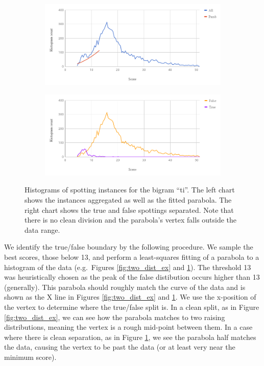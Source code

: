 \documentclass[ms,electronic,twosidetoc,letterpaper,chaptercenter,parttop,lof,lot]{byumsphd}
\begin{document}
\begin{figure}
    \centering
    \begin{subfigure}{.89\textwidth}
  		\centering
  		\includegraphics[width=.99\linewidth]{one_dist_ex_All}
	\end{subfigure}
	\begin{subfigure}{.89\textwidth}
  		\centering
  		\includegraphics[width=.99\linewidth]{one_dist_ex_TF}
	\end{subfigure}
    \caption{Histograms of spotting instances for the bigram ``ti''. The left chart shows the instances aggregated as well as the fitted parabola. The right chart shows the true and false spottings separated. Note that there is no clean division and the parabola's vertex falls outside the data range.
    }
    \label{fig:one_dist_ex}
\end{figure}

We identify the true/false boundary by the following procedure. We sample the best scores, those below 13, and perform a least-squares fitting of a parabola to a histogram of the data (e.g.~Figures \ref{fig:two_dist_ex} and \ref{fig:one_dist_ex}). The threshold 13 was heuristically chosen as the peak of the false distibution occurs higher than 13 (generally). This parabola should roughly match the curve of the data and is shown as the X line in Figures \ref{fig:two_dist_ex} and \ref{fig:one_dist_ex}. We use the x-position of the vertex to determine where the true/false split is. In a clean split, as in Figure \ref{fig:two_dist_ex}, we can see how the parabola matches to two raising distributions, meaning the vertex is a rough mid-point between them. In a case where there is clean separation, as in Figure \ref{fig:one_dist_ex}, we see the parabola half matches the data, causing the vertex to be past the data (or at least very near the minimum score).
\end{document}
